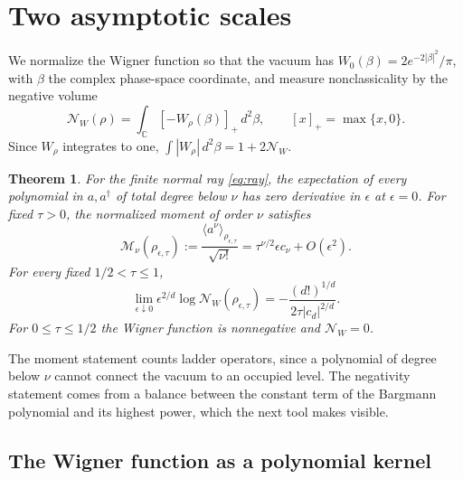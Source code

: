 \documentclass[11pt,a4paper]{article}
\newcommand{\ev}[1]{\langle#1\rangle}
\newcommand{\NW}{\mathcal N_W}
\newcommand{\M}{\mathcal M}
\newtheorem{theorem}{Theorem}
\begin{document}
\section{Two asymptotic scales}
\label{sec:theorem}

We normalize the Wigner function so that the vacuum has $W_0(\beta)=2e^{-2|\beta|^2}/\pi$, with $\beta$ the complex phase-space coordinate, and measure nonclassicality by the negative volume
\begin{equation}
 \NW(\rho)=\int_{\mathbb C}[-W_\rho(\beta)]_+\,d^2\beta,
 \qquad [x]_+=\max\{x,0\}.
 \label{eq:negativity}
\end{equation}
Since $W_\rho$ integrates to one, $\int|W_\rho|\,d^2\beta=1+2\NW$.

\begin{theorem}
\label{thm:scales}
For the finite normal ray \eqref{eq:ray}, the expectation of every polynomial in $a,a^\dagger$ of total degree below $\nu$ has zero derivative in $\epsilon$ at $\epsilon=0$. For fixed $\tau>0$, the normalized moment of order $\nu$ satisfies
\begin{equation}
 \M_\nu(\rho_{\epsilon,\tau})
 :=\frac{\ev{a^\nu}_{\rho_{\epsilon,\tau}}}{\sqrt{\nu!}}
 =\tau^{\nu/2}\epsilon c_\nu+O(\epsilon^2).
 \label{eq:first}
\end{equation}
For every fixed $1/2<\tau\le1$,
\begin{equation}
 \lim_{\epsilon\downarrow0}\epsilon^{2/d}
 \log\NW(\rho_{\epsilon,\tau})
 =-\frac{(d!)^{1/d}}{2\tau|c_d|^{2/d}}.
 \label{eq:rate}
\end{equation}
For $0\le\tau\le1/2$ the Wigner function is nonnegative and $\NW=0$.
\end{theorem}

The moment statement counts ladder operators, since a polynomial of degree below $\nu$ cannot connect the vacuum to an occupied level. The negativity statement comes from a balance between the constant term of the Bargmann polynomial and its highest power, which the next tool makes visible.

\subsection{The Wigner function as a polynomial kernel}
\end{document}
